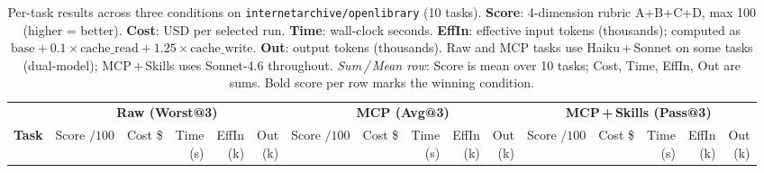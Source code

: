 \documentclass[10pt]{article}
\begin{document}
\pagestyle{empty}

\begin{longtable}{@{}
    l
    | r r r r r
    | r r r r r
    | r r r r r
  @{}}

\caption{%
  Per-task results across three conditions on \texttt{internetarchive/openlibrary} (10 tasks).
  \textbf{Score}: 4-dimension rubric A+B+C+D, max 100 (higher = better).
  \textbf{Cost}: USD per selected run.
  \textbf{Time}: wall-clock seconds.
  \textbf{EffIn}: effective input tokens (thousands); computed as
  $\text{base} + 0.1{\times}\text{cache\_read} + 1.25{\times}\text{cache\_write}$.
  \textbf{Out}: output tokens (thousands).
  Raw and MCP tasks use Haiku\,+\,Sonnet on some tasks (dual-model);
  MCP\,+\,Skills uses Sonnet-4.6 throughout.
  \emph{Sum\,/\,Mean row}: Score is mean over 10 tasks; Cost, Time, EffIn, Out are sums.
  Bold score per row marks the winning condition.
}\label{tab:comparison}\\

\toprule
& \multicolumn{5}{c|}{\cellcolor{rawbg}\textbf{Raw (Worst@3)}}
& \multicolumn{5}{c|}{\cellcolor{mcpbg}\textbf{MCP (Avg@3)}}
& \multicolumn{5}{c}{\cellcolor{skillsbg}\textbf{MCP\,+\,Skills (Pass@3)}} \\
\cmidrule(lr){2-6}\cmidrule(lr){7-11}\cmidrule(lr){12-16}
\textbf{Task}
  & \makecell{Score\\$/100$} & \makecell{Cost\\\$} & \makecell{Time\\(s)} & \makecell{EffIn\\(k)} & \makecell{Out\\(k)}
  & \makecell{Score\\$/100$} & \makecell{Cost\\\$} & \makecell{Time\\(s)} & \makecell{EffIn\\(k)} & \makecell{Out\\(k)}
  & \makecell{Score\\$/100$} & \makecell{Cost\\\$} & \makecell{Time\\(s)} & \makecell{EffIn\\(k)} & \makecell{Out\\(k)} \\
\midrule
\endfirsthead


\end{longtable}
\end{document}
